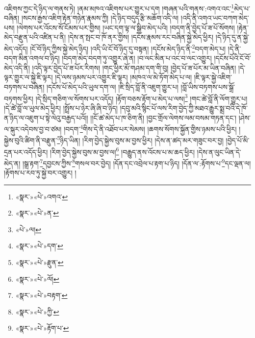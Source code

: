 འཇིགས་ཀྱང་དེ་ཉིད་ལ་གནས་ཏེ། །ནམ་མཁའ་འཇིགས་པར་གྱུར་པ་དག །གཞན་པའི་གནས་:འགའ་འང་\footnote{«སྣར་»«པེ་»འགའ་}མེད་པ་བཞིན། །སངས་རྒྱས་འཇིག་རྟེན་གཉེན་རྣམས་ཀྱི། །དེ་ཉིད་བདུད་རྩི་མཆོག་འདི་ལ། །འདི་ནི་འགའ་ཡང་བཀག་མེད་པས། །ལེགས་པར་འོངས་སོ་ངོམས་པར་གྱིས། །ཡང་དག་ལྟ་ལ་སྒྲིབ་མེད་པའི། །བདག་ནི་བྱེད་པོ་ཟ་པོ་སོགས། །རྟེན་མེད་བརྫུན་པའི་འཛིན་པ་ནི། །དེས་ན་སྤང་བ་ཁོ་ནར་གྱིས། །དངོས་རྣམས་རང་བཞིན་སྐྱེ་མེད་ཕྱིར། །དེ་ཉིད་དུ་ན་སྐྱེ་མེད་འདོད། །ངོ་བོ་ཉིད་ཀྱིས་སྐྱེ་མེད་ཉིད། །འདི་ཡི་ངོ་བོ་ཉིད་དུ་བསྟན། །དངོས་མེད་ཉིད་ནི་\footnote{«སྣར་»«པེ་»ན་}བདག་མེད་པ། །དེ་ནི་བདག་མིན་འགལ་བ་ཉིད། །བདག་མེད་བདག་ཏུ་འགྱུར་ཞེ་ན། །བ་ལང་མིན་པ་འང་བ་ལང་འགྱུར། །དངོས་པོའི་ངོ་བོ་མེད་འདི་ནི། །འདི་ལྟར་བྱེད་པོ་ཟ་པོར་རིགས། །གང་ཕྱིར་མོ་གཤམ་དག་གི་བུ། །བྱེད་པོ་ཟ་པོར་མ་ཡིན་བཞིན། །དེ་ལྟར་གྱུར་ལ་སྐྱེ་ཇི་ལྟར། །དེ་ལས་ཉམས་པར་འགྱུར་ཇི་ལྟར། །མཁའ་ལ་མེ་ཏོག་མེད་པ་ལ། །ཇི་ལྟར་སྐྱེ་འཇིག་བཏགས་པ་བཞིན། །དངོས་པོ་མེད་པའི་ཡུལ་དག་ལ། །ཇི་སྲིད་བློ་ནི་འཇུག་གྱུར་པ། །བློ་ཡིས་བཏགས་པས་སྒྲོ་བཏགས་ཕྱིར། །དེ་སྲིད་གཅིག་ལ་སོགས་པར་འདོད། །རྟོག་བཅས་རྟོག་པ་མེད་པ་ལས།\footnote{«པེ་»ལ།} །གང་ཚེ་བློ་ནི་ལོག་གྱུར་པ། །དེ་ཚེ་བློ་ལ་ཡུལ་མེད་ཕྱིར། །སྤྲོས་པ་ཉེར་ཞི་ཞི་བ་ཉིད། །དབུ་མའི་སྙིང་པོ་ལས་རིག་བྱེད་ཀྱི་མཐའ་རྒྱུར་སྨྲ་བའི་དེ་ཁོ་ན་ཉིད་ལ་འཇུག་པ་སྟེ་ལེའུ་བརྒྱད་པའོ།། །།ངོ་ཚ་མེད་པ་ཁ་ཅིག་ནི། །བྱང་གྲོལ་ལེགས་ལམ་བསམ་གཏན་དང་། །ཤེས་ལ་སྐུར་འདེབས་བྱ་བ་ཙམ། །བདག་\footnote{«སྣར་»«པེ་»དག་}གིས་དེ་ནི་འཐོབ་པར་སེམས། །ཆགས་སོགས་སྐྱོན་གྱིས་ཉམས་པའི་ཕྱིར། །སྐྱེས་བུའི་ཚིག་ནི་བརྫུན་\footnote{«སྣར་»«པེ་»རྫུན་}ཉིད་ཡིན། །རིག་བྱེད་སྐྱེས་བུས་མ་བྱས་ཕྱིར། །དེས་ན་ཚད་མར་གཟུང་བར་བྱ། །བྱེད་པོ་མི་དྲན་པར་འདོད་ཕྱིར། །རིག་བྱེད་སྐྱེས་བུས་མ་བྱས་ལ།\footnote{«སྣར་»«པེ་»ལོ།} །བརྒྱུད་ནས་འོངས་པ་མ་ཆད་ཕྱིར། །དེས་ན་ལུང་ཡིན་དེ་མེད་ན། །སྒྲ་རྟག་\footnote{«སྣར་»«པེ་»བརྟག་}དབྱངས་ཀྱིས་\footnote{«སྣར་»«པེ་»ཀྱི་}གསལ་བར་བྱེད། །དོན་དང་འབྲེལ་པ་རྟག་པ་ཉིད། །དོན་ལ་:རྟོགས་པ་\footnote{«སྣར་»«པེ་»རྟོག་པ་}དང་ལྡན་ལ། །རྟོགས་པ་རབ་ཏུ་སྐྱེ་བར་འགྱུར། །
